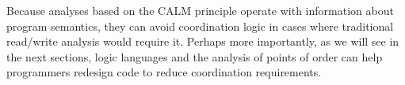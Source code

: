 Because analyses based on the CALM principle operate with information about
program semantics, they can avoid coordination logic in cases where traditional
read/write analysis would require it.  Perhaps more importantly, as we will see
in the next sections, logic languages and the analysis of points of order can
help programmers redesign code to reduce coordination requirements.


% 



